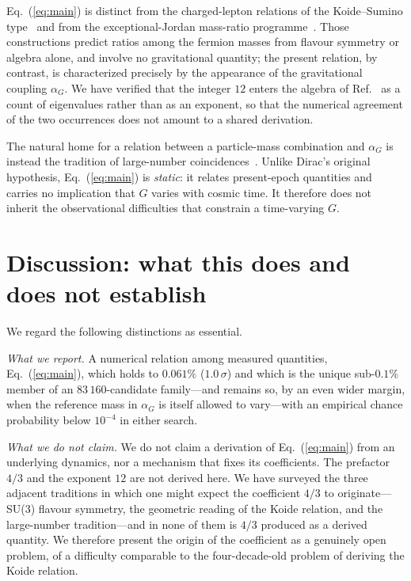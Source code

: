 \documentclass[aps,prd,twocolumn,amsmath,amssymb,floatfix,nofootinbib]{revtex4-2}
\begin{document}
Eq.~(\ref{eq:main}) is distinct from the charged-lepton relations of the
Koide--Sumino type~\cite{koide1983,sumino2009} and from the exceptional-Jordan
mass-ratio programme~\cite{singh2021}. Those constructions predict ratios among
the fermion masses from flavour symmetry or algebra alone, and involve no
gravitational quantity; the present relation, by contrast, is characterized
precisely by the appearance of the gravitational coupling $\alpha_G$. We have
verified that the integer $12$ enters the algebra of Ref.~\cite{singh2021} as a
count of eigenvalues rather than as an exponent, so that the numerical
agreement of the two occurrences does not amount to a shared derivation.

The natural home for a relation between a particle-mass combination and
$\alpha_G$ is instead the tradition of large-number
coincidences~\cite{dirac1938,wesson1980}. Unlike Dirac's original hypothesis,
Eq.~(\ref{eq:main}) is \emph{static}: it relates present-epoch quantities and
carries no implication that $G$ varies with cosmic time. It therefore does not
inherit the observational difficulties that constrain a time-varying $G$.

\section{Discussion: what this does and does not establish}
\label{sec:discussion}

We regard the following distinctions as essential.

\emph{What we report.} A numerical relation among measured quantities,
Eq.~(\ref{eq:main}), which holds to $0.061\%$ ($1.0\,\sigma$) and which is
the unique sub-$0.1\%$ member of an $83\,160$-candidate family---and remains
so, by an even wider margin, when the reference mass in $\alpha_G$ is itself
allowed to vary---with an empirical chance probability below $10^{-4}$ in
either search.

\emph{What we do not claim.} We do not claim a derivation of
Eq.~(\ref{eq:main}) from an underlying dynamics, nor a mechanism that fixes its
coefficients. The prefactor $4/3$ and the exponent $12$ are not derived here.
We have surveyed the three adjacent traditions in which one might expect the
coefficient $4/3$ to originate---SU(3) flavour symmetry, the geometric reading
of the Koide relation, and the large-number tradition---and in none of them is
$4/3$ produced as a derived quantity. We therefore present the origin of the
coefficient as a genuinely open problem, of a difficulty comparable to the
four-decade-old problem of deriving the Koide relation.
\end{document}
